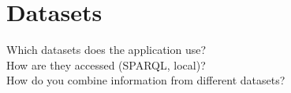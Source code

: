 \section{Datasets}
Which datasets does the application use? \\
How are they accessed (SPARQL, local)? \\
How do you combine information from different datasets?